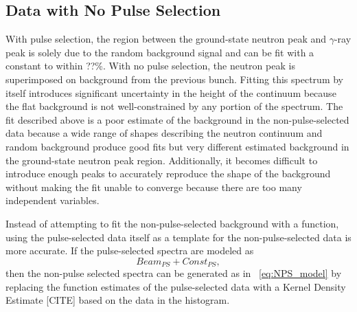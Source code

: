 \subsection{Data with No Pulse Selection}
With pulse selection, the region between the ground-state neutron peak and $\gamma$-ray peak is solely due to the random background signal and can be fit with a constant to within ??\%.  With no pulse selection, the neutron peak is superimposed on background from the previous bunch.  Fitting this spectrum by itself introduces significant uncertainty in the height of the continuum because the flat background is not well-constrained by any portion of the spectrum.  The fit described above is a poor estimate of the background in the non-pulse-selected data because a wide range of shapes describing the neutron continuum and random background produce good fits but very different estimated background in the ground-state neutron peak region.  Additionally, it becomes difficult to introduce enough peaks to accurately reproduce the shape of the background without making the fit unable to converge because there are too many independent variables. 

Instead of attempting to fit the non-pulse-selected background with a function, using the pulse-selected data itself as a template for the non-pulse-selected data is more accurate.  If the pulse-selected spectra are modeled as
\begin{equation}
Beam_{PS} + Const_{PS},
\end{equation}
then the non-pulse selected spectra can be generated as in {\eqn}~\ref{eq:NPS_model} by replacing the function estimates of the pulse-selected data with a Kernel Density Estimate [CITE] based on the data in the histogram.  

